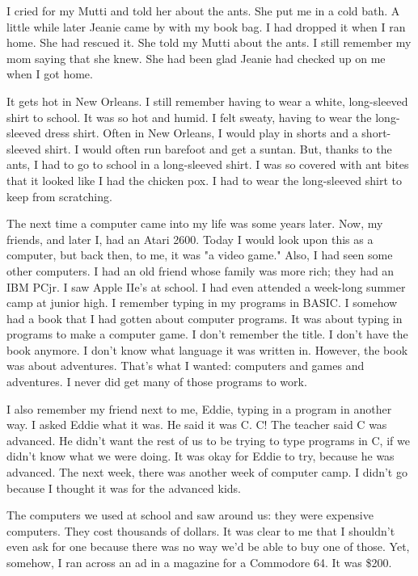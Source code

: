 I cried for my Mutti and told her about the ants.  She put me in a cold bath.  A little while later Jeanie came by with my book bag.  I had dropped it when I ran home.  She had rescued it. She told my Mutti about the ants.  I still remember my mom saying that she knew.  She had been glad Jeanie had checked up on me when I got home.

It gets hot in New Orleans.  I still remember having to wear a white, long-sleeved shirt to school.  It was so hot and humid.  I felt sweaty, having to wear the long-sleeved dress shirt.  Often in New Orleans, I would play in shorts and a short-sleeved shirt.  I would often run barefoot and get a suntan.  But, thanks to the ants, I had to go to school in a long-sleeved shirt.  I was so covered with ant bites that it looked like I had the chicken pox.  I had to wear the long-sleeved shirt to keep from scratching.

The next time a computer came into my life was some years later.  Now, my friends, and later I, had an Atari 2600.  Today I would look upon this as a computer, but back then, to me, it was "a video game."  Also, I had seen some other computers.  I had an old friend whose family was more rich; they had an IBM PCjr.  I saw Apple IIe's at school.  I had even attended a week-long summer camp at junior high.  I remember typing in my programs in BASIC.  I somehow had a book that I had gotten about computer programs.  It was about typing in programs to make a computer game.  I don't remember the title.  I don't have the book anymore.  I don't know what language it was written in.  However, the book was about adventures.  That's what I wanted:  computers and games and adventures.  I never did get many of those programs to work.

I also remember my friend next to me, Eddie, typing in a program in another way.  I asked Eddie what it was.  He said it was C.  C!  The teacher said C was advanced.  He didn't want the rest of us to be trying to type programs in C, if we didn't know what we were doing.  It was okay for Eddie to try, because he was advanced.  The next week, there was another week of computer camp.  I didn't go because I thought it was for the advanced kids.

The computers we used at school and saw around us:  they were expensive computers.  They cost thousands of dollars.  It was clear to me that I shouldn't even ask for one because there was no way we'd be able to buy one of those.  Yet, somehow, I ran across an ad in a magazine for a Commodore 64.  It was \$200.

